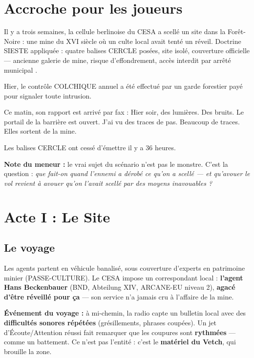 \documentclass[10pt,a5paper,twoside]{book}
\begin{document}
\clearpage

\section{Accroche pour les joueurs}

\begin{shaded}
Il y a trois semaines, la cellule berlinoise du CESA a scellé un site dans la Forêt-Noire : une mine du XVI\ieme{} siècle où un culte local avait tenté un réveil. Doctrine SIESTE appliquée : quatre balises CERCLE posées, site isolé, couverture officielle --- \og ancienne galerie de mine, risque d'effondrement, accès interdit par arrêté municipal \fg.

Hier, le contrôle COLCHIQUE annuel a été effectué par un garde forestier payé pour signaler toute intrusion.

Ce matin, son rapport est arrivé par fax : \og Hier soir, des lumières. Des bruits. Le portail de la barrière est ouvert. J'ai vu des traces de pas. Beaucoup de traces. Elles sortent de la mine. \fg

Les balises CERCLE ont cessé d'émettre il y a 36 heures.
\end{shaded}

\begin{shaded}
\textbf{Note du meneur :} le vrai sujet du scénario n'est pas le monstre. C'est la question : \emph{que fait-on quand l'ennemi a dérobé ce qu'on a scellé --- et qu'avouer le vol revient à avouer qu'on l'avait scellé par des moyens inavouables ?}
\end{shaded}

\clearpage

\section{Acte I : Le Site}

\subsection{Le voyage}

Les agents partent en véhicule banalisé, sous couverture d'\og experts en patrimoine minier \fg{} (PASSE-CULTURE). Le CESA impose un correspondant local : \textbf{l'agent Hans Beckenbauer} (BND, Abteilung XIV, ARCANE-EU niveau 2), \textbf{agacé d'être réveillé pour ça} --- son service n'a jamais cru à l'affaire de la mine.

\begin{shaded}
\textbf{Événement du voyage :} à mi-chemin, la radio capte un bulletin local avec des \textbf{difficultés sonores répétées} (grésillements, phrases coupées). Un jet d'Écoute/Attention réussi fait remarquer que les coupures sont \textbf{rythmées} --- comme un battement. Ce n'est pas l'entité : c'est le \textbf{matériel du Vetch}, qui brouille la zone.
\end{shaded}
\end{document}

